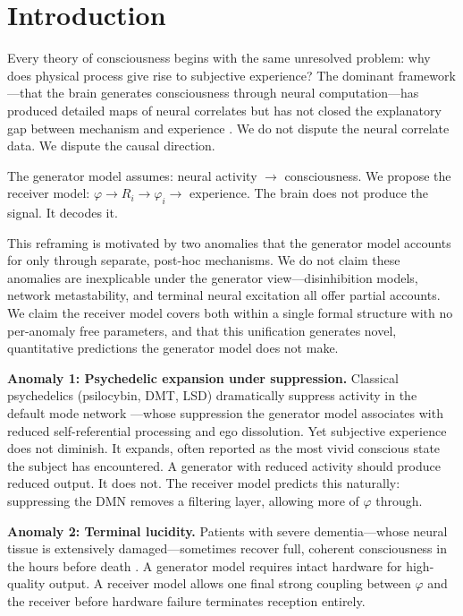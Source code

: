 \documentclass[12pt]{article}
\begin{document}
\section{Introduction}

Every theory of consciousness begins with the same unresolved problem: why does physical process give rise to subjective experience? The dominant framework---that the brain generates consciousness through neural computation---has produced detailed maps of neural correlates but has not closed the explanatory gap between mechanism and experience \cite{chalmers1995}. We do not dispute the neural correlate data. We dispute the causal direction.

The generator model assumes: neural activity $\rightarrow$ consciousness. We propose the receiver model: $\varphi \rightarrow R_i \rightarrow \varphi_i \rightarrow$ experience. The brain does not produce the signal. It decodes it.

This reframing is motivated by two anomalies that the generator model accounts for only through separate, post-hoc mechanisms. We do not claim these anomalies are inexplicable under the generator view---disinhibition models, network metastability, and terminal neural excitation all offer partial accounts. We claim the receiver model covers both within a single formal structure with no per-anomaly free parameters, and that this unification generates novel, quantitative predictions the generator model does not make.

\textbf{Anomaly 1: Psychedelic expansion under suppression.}
Classical psychedelics (psilocybin, DMT, LSD) dramatically suppress activity in the default mode network \cite{carhart-harris2012}---whose suppression the generator model associates with reduced self-referential processing and ego dissolution. Yet subjective experience does not diminish. It expands, often reported as the most vivid conscious state the subject has encountered. A generator with reduced activity should produce reduced output. It does not. The receiver model predicts this naturally: suppressing the DMN removes a filtering layer, allowing more of $\varphi$ through.

\textbf{Anomaly 2: Terminal lucidity.}
Patients with severe dementia---whose neural tissue is extensively damaged---sometimes recover full, coherent consciousness in the hours before death \cite{nahm2012}. A generator model requires intact hardware for high-quality output. A receiver model allows one final strong coupling between $\varphi$ and the receiver before hardware failure terminates reception entirely.
\end{document}
